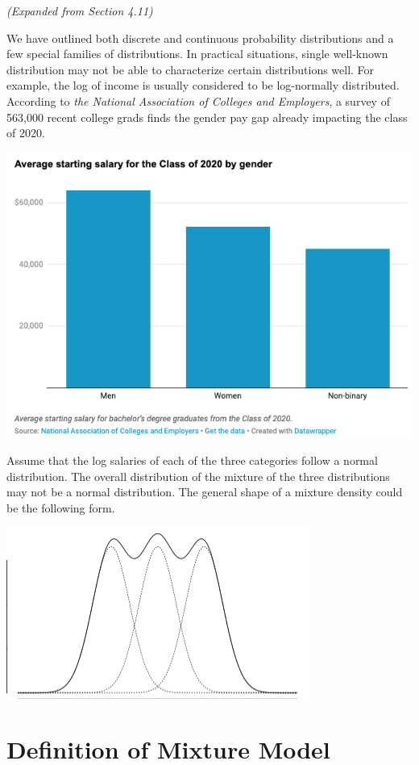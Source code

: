 \documentclass[
]{book}
\begin{document}
\emph{(Expanded from Section 4.11)}

We have outlined both discrete and continuous probability distributions and a few special families of distributions. In practical situations, single well-known distribution may not be able to characterize certain distributions well. For example, the log of income is usually considered to be log-normally distributed. According to \emph{the National Association of Colleges and Employers}, a survey of 563,000 recent college grads finds the gender pay gap already impacting the class of 2020.

\begin{center}\includegraphics[width=0.5\linewidth]{topic04/sallaryGapGender} \end{center}

Assume that the log salaries of each of the three categories follow a normal distribution. The overall distribution of the mixture of the three distributions may not be a normal distribution. The general shape of a mixture density could be the following form.

\begin{center}\includegraphics[width=0.6\linewidth]{topic04/mixtureDensityCurve} \end{center}

\hfill\break

\hypertarget{definition-of-mixture-model}{%
\section{Definition of Mixture Model}\label{definition-of-mixture-model}}
\end{document}

